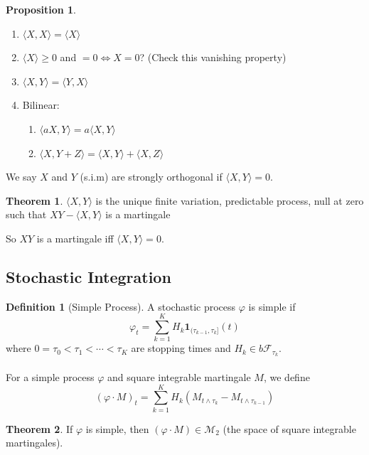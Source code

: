 \documentclass[11pt,a4paper]{article}
\theoremstyle{definition}
\newtheorem{definition}{Definition}[section]
\newtheorem{theorem}{Theorem}[section]
\newtheorem{proposition}{Proposition}[section]
\begin{document}
\begin{proposition}\label{prop:covariation_properties}
\begin{enumerate}
    \item $\langle X, X \rangle = \langle X \rangle$
    \item $\langle X \rangle \ge 0$ and $ = 0 \iff X = 0$? (Check this vanishing property)
    \item $\langle X, Y \rangle = \langle Y, X \rangle$
    \item Bilinear:
    \begin{enumerate}
    \item $\langle aX, Y \rangle = a \langle X, Y \rangle$
    \item $\langle X, Y+Z \rangle = \langle X, Y \rangle + \langle X, Z \rangle$
    \end{enumerate}
\end{enumerate}
\end{proposition}

We say $X$ and $Y$ (s.i.m) are strongly orthogonal if $\langle X, Y \rangle = 0$.

\begin{theorem}\label{thm:covariation_characterization}
$\langle X, Y \rangle$ is the unique finite variation, predictable process, null at zero such that $XY - \langle X, Y \rangle$ is a martingale
\end{theorem}
So $XY$ is a martingale iff $\langle X, Y \rangle = 0$.

\subsection{Stochastic Integration}

\begin{definition}[Simple Process]\label{def:simple_process}
A stochastic process $\varphi$ is simple if
\[
\varphi_t = \sum_{k=1}^{K} H_k \mathbf{1}_{(\tau_{k-1}, \tau_k]}(t)
\]
where $0 = \tau_0 < \tau_1 < \cdots < \tau_K$ are stopping times and $H_k \in b\mathcal{F}_{\tau_k}$.
~\\~\\
For a simple process $\varphi$ and square integrable martingale $M$, we define
\[
(\varphi \cdot M)_t = \sum_{k=1}^{K} H_k (M_{t \wedge \tau_k} - M_{t \wedge \tau_{k-1}})
\]
\end{definition}

\begin{theorem}\label{thm:simple_stoch_int}
If $\varphi$ is simple, then $(\varphi \cdot M) \in \mathcal{M}_2$ (the space of square integrable martingales).
\end{theorem}
\end{document}
